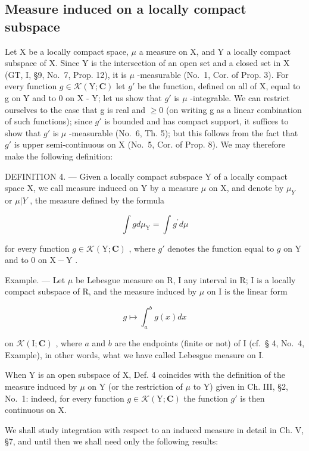 \subsection{Measure induced on a locally compact subspace}

Let X be a locally compact space, \(\mu\) a measure on X, and Y a locally compact subspace of X. Since Y is the intersection of an open set and a closed set in X (GT, I, §9, No.~7, Prop. 12), it is \(\mu\) -measurable (No.~1, Cor. of Prop. 3). For every function \(g \in \mathcal{K}(\mathrm{Y};\mathbf{C})\) let \(g'\) be the function, defined on all of X, equal to g on Y and to 0 on X - Y; let us show that \(g'\) is \(\mu\) -integrable. We can restrict ourselves to the case that g is real and \(\geqslant 0\) (on writing g as a linear combination of such functions); since \(g'\) is bounded and has compact support, it suffices to show that \(g'\) is \(\mu\) -measurable (No.~6, Th. 5); but this follows from the fact that \(g'\) is upper semi-continuous on X (No.~5, Cor. of Prop. 8). We may therefore make the following definition:

DEFINITION 4. --- Given a locally compact subspace Y of a locally compact space X, we call measure induced on Y by a measure \(\mu\) on X, and denote by \(\mu_{Y}\) or \(\mu|Y\) , the measure defined by the formula

\[
\int g d \mu_ {\mathrm{Y}} = \int g ^ {\prime} d \mu\tag{1}
\]

for every function \(g \in \mathcal{K}(\mathrm{Y};\mathbf{C})\) , where \(g'\) denotes the function equal to \(g\) on \(\mathrm{Y}\) and to 0 on \(\mathrm{X} - \mathrm{Y}\) .

Example. --- Let \(\mu\) be Lebesgue measure on R, I any interval in R; I is a locally compact subspace of R, and the measure induced by \(\mu\) on I is the linear form

\[
g \mapsto \int_ {a} ^ {b} g (x) d x
\]

on \(\mathcal{K}(\mathrm{I};\mathbf{C})\) , where \(a\) and \(b\) are the endpoints (finite or not) of I (cf.~§ 4, No.~4, Example), in other words, what we have called Lebesgue measure on I.

When Y is an open subspace of X, Def. 4 coincides with the definition of the measure induced by \(\mu\) on Y (or the restriction of \(\mu\) to Y) given in Ch. III, §2, No.~1: indeed, for every function \(g \in \mathcal{K}(\mathrm{Y}; \mathbf{C})\) the function \(g'\) is then continuous on X.

We shall study integration with respect to an induced measure in detail in Ch. V, §7, and until then we shall need only the following results:

